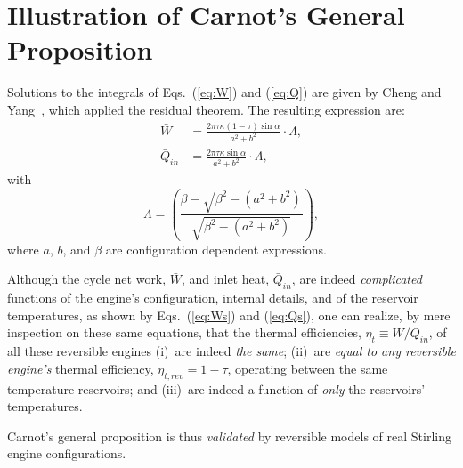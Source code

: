 \section{Illustration of Carnot's General Proposition}

    Solutions to the integrals of Eqs.~(\ref{eq:W}) and (\ref{eq:Q})  are  given  by  Cheng  and
    Yang~\cite{2012-ChengCH+YangHS-ApEnergy}, which applied the residual theorem. The  resulting
    expression are:
    \begin{align}
        \label{eq:Ws}
        \bar{W} &= \frac{2\pi\tau\kappa(1 - \tau)\sin\alpha}{a^2 + b^2}\cdot\Lambda,\\
        \label{eq:Qs}
        \bar{Q}_{in} &= \frac{2\pi\tau\kappa\sin\alpha}{a^2 + b^2}\cdot\Lambda,
    \end{align}
    \noindent with
    \begin{equation}
        \label{eq:Lamda}
        \Lambda = \left(
                \frac{\beta - \sqrt{\beta^2 - (a^2 + b^2)}}{\sqrt{\beta^2 - (a^2 + b^2)}}
            \right),
    \end{equation}
    \noindent where $a$, $b$, and $\beta$ are configuration dependent expressions.

    Although the  cycle  net  work,  $\bar{W}$,  and  inlet  heat,  $\bar{Q}_{in}$,  are  indeed
    \emph{complicated} functions of the engine's configuration, internal  details,  and  of  the
    reservoir temperatures, as shown by Eqs.~(\ref{eq:Ws}) and (\ref{eq:Qs}), one  can  realize,
    by mere inspection on these same equations, that the thermal  efficiencies,  $\eta_t  \equiv
    \bar{W} / \bar{Q}_{in}$, of all these reversible engines  (i)~are  indeed  \emph{the  same};
    (ii)~are \emph{equal to any reversible engine's} thermal efficiency,  $\eta_{t,rev}  =  1  -
    \tau$, operating between the same temperature reservoirs; and (iii)~are indeed a function of
    \emph{only} the reservoirs' temperatures.

    Carnot's general proposition is thus \emph{validated} by reversible models of real  Stirling
    engine configurations.

